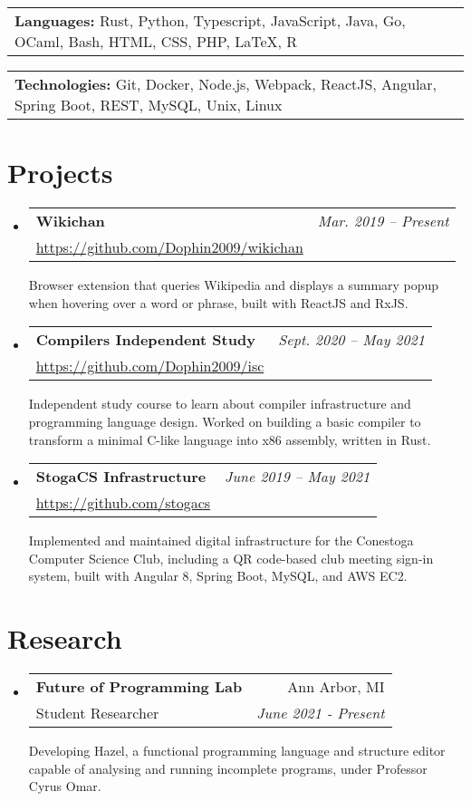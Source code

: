 \documentclass[letterpaper,11pt]{article}
\makeatletter
\newcommand{\resumeSubheading}[4]{
  \vspace{-2pt}\item
    \begin{tabular*}{0.97\textwidth}[t]{l@{\extracolsep{\fill}}r}
      \textbf{#1} & #2 \\
      {#3} & \textit{\small #4} \\[3pt]
    \end{tabular*}\vspace{-5pt}
}
\newcommand{\resumeSubSubSubheading}[2]{
    \begin{tabular*}{0.97\textwidth}{l}
      \textbf{#1:} #2 \\
    \end{tabular*}
}
\newenvironment{resumeSubHeadingList}{\begin{itemize}[leftmargin=*, label={}]}{\end{itemize}}
\makeatother
\begin{document}
  \begin{resumeSubHeadingList}
    \resumeSubSubSubheading{Languages}%
      {Rust, Python, Typescript, JavaScript, Java, Go, OCaml, Bash, HTML, CSS, PHP, LaTeX, R}
    \resumeSubSubSubheading{Technologies}%
      {Git, Docker, Node.js, Webpack, ReactJS, Angular, Spring Boot, REST, MySQL, Unix, Linux}
  \end{resumeSubHeadingList}

\section{Projects}

  \begin{resumeSubHeadingList}
    \resumeSubheading%
      {Wikichan}%
      {\small\itshape Mar. 2019 -- Present}%
      {\small \url{https://github.com/Dophin2009/wikichan}}%
      {}

      Browser extension that queries Wikipedia and displays a summary popup when hovering over a
      word or phrase, built with ReactJS and RxJS.

    \resumeSubheading%
      {Compilers Independent Study}%
      {\small\itshape Sept. 2020 -- May 2021}%
      {\small \url{https://github.com/Dophin2009/isc}}%
      {}

      Independent study course to learn about compiler infrastructure and programming language
        design. Worked on building a basic compiler to transform a minimal C-like language into x86
        assembly, written in Rust.

    \resumeSubheading%
      {StogaCS Infrastructure}%
      {\small\itshape June 2019 -- May 2021}%
      {\small \url{https://github.com/stogacs}}%
      {}

      Implemented and maintained digital infrastructure for the Conestoga Computer Science Club,
        including a QR code-based club meeting sign-in system, built with Angular 8, Spring Boot,
        MySQL, and AWS EC2.
  \end{resumeSubHeadingList}

\section{Research}

  \begin{resumeSubHeadingList}
    \resumeSubheading%
      {Future of Programming Lab}%
      {Ann Arbor, MI}%
      {Student Researcher}%
      {June 2021 - Present}

      Developing Hazel, a functional programming language and structure editor capable of analysing
        and running incomplete programs, under Professor Cyrus Omar.
  \end{resumeSubHeadingList}
\end{document}
